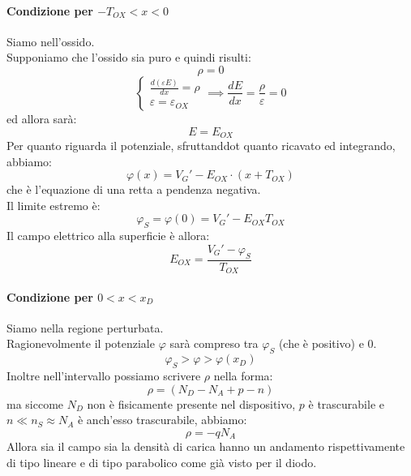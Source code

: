 \documentclass{article}
\numberwithin{equation}{subsection}
\begin{document}
	\paragraph{Condizione per $-T_{OX} < x < 0$}
	Siamo nell'ossido.\\
	Supponiamo che l'ossido sia puro e quindi risulti:
	$$\rho = 0$$
	$$\begin{cases} \frac{d(\varepsilon E)}{dx} = \rho \\ \varepsilon = \varepsilon_{OX} \end{cases} \implies \frac{dE}{dx} = \frac{\rho}{\varepsilon} = 0$$
	ed allora sarà:
	$$E = E_{OX}$$
	Per quanto riguarda il potenziale, sfruttanddot quanto ricavato ed integrando, abbiamo:
	$$\varphi(x) = V_G' - E_{OX} \cdot (x + T_{OX})$$
	che è l'equazione di una retta a pendenza negativa.\\
	Il limite estremo è:
	$$\varphi_S = \varphi(0) = V_G' - E_{OX}T_{OX}$$
	Il campo elettrico alla superficie è allora:
	$$E_{OX} = \frac{V_G' - \varphi_S}{T_{OX}}$$
	\paragraph{Condizione per $0 < x < x_D$}
	Siamo nella regione perturbata.\\
	Ragionevolmente il potenziale $\varphi$ sarà compreso tra $\varphi_S$ (che è positivo) e $0$.
	$$\varphi_S > \varphi > \varphi(x_D)$$
	Inoltre nell'intervallo possiamo scrivere $\rho$ nella forma:
	$$\rho = (N_D - N_A + p - n)$$
	ma siccome $N_D$ non è fisicamente presente nel dispositivo, $p$ è trascurabile e $n \ll n_S \approx N_A$ è anch'esso trascurabile, abbiamo:
	$$\rho = -qN_A$$
	Allora sia il campo sia la densità di carica hanno un andamento rispettivamente di tipo lineare e di tipo parabolico come già visto per il diodo.
\end{document}
